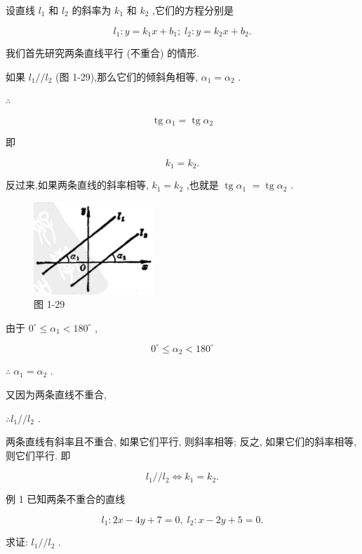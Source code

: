 \documentclass[lang=cn,newtx,10pt,scheme=chinese]{elegantbook}
\begin{document}
设直线 \({l}_{1}\) 和 \({l}_{2}\) 的斜率为 \({k}_{1}\) 和 \({k}_{2}\) ,它们的方程分别是

\[
    {l}_{1} : y = {k}_{1}x + {b}_{1};\;{l}_{2} : y = {k}_{2}x + {b}_{2}.
\]

我们首先研究两条直线平行 (不重合) 的情形.

如果 \({l}_{1}//{l}_{2}\) (图 1-29),那么它们的倾斜角相等, \({\alpha }_{1} = {\alpha }_{2}\) .

\(\therefore\)

\[
  \operatorname{tg}{\alpha }_{1} = \operatorname{tg}{\alpha }_{2}
\]

即

\[
    {k}_{1} = {k}_{2}\text{.}
\]

反过来,如果两条直线的斜率相等, \({k}_{1} = {k}_{2}\) ,也就是 \(\operatorname{tg}{\alpha }_{1}\) \(= \operatorname{tg}{\alpha }_{2}\) .

\begin{figure}[h]
  \centering
  \includegraphics[max width=0.4\textwidth]{images/01912cc2-ffb6-728e-9ae7-b113ff05c64b_42_859750.jpg}
  \caption{图 1-29}
\end{figure}



由于 \({0}^{ \circ } \leq {\alpha }_{1} < {180}^{ \circ }\) ,

\[
    {0}^{ \circ } \leq {\alpha }_{2} < {180}^{ \circ }
\]

\(\therefore \;{\alpha }_{1} = {\alpha }_{2}\) .

又因为两条直线不重合,

\(\therefore {l}_{1}//{l}_{2}\) .

两条直线有斜率且不重合, 如果它们平行, 则斜率相等; 反之, 如果它们的斜率相等, 则它们平行. 即

\[
    {l}_{1}//{l}_{2} \Leftrightarrow {k}_{1} = {k}_{2}\text{.}
\]

例 1 已知两条不重合的直线

\[
    {l}_{1} : {2x} - {4y} + 7 = 0,\;{l}_{2} : x - {2y} + 5 = 0.
\]

求证: \({l}_{1}//{l}_{2}\) .
\end{document}

